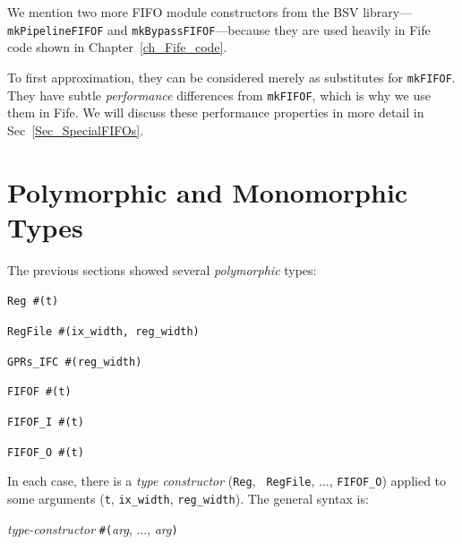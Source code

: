 
We mention two more FIFO module constructors from the BSV library---
{\tt mkPipelineFIFOF} and {\tt mkBypassFIFOF}---because they are used
heavily in Fife code shown in Chapter~\ref{ch_Fife_code}.

To first approximation, they can be considered merely as substitutes
for {\tt mkFIFOF}.  They have subtle \emph{performance} differences
from {\tt mkFIFOF}, which is why we use them in Fife.  We will discuss
these performance properties in more detail in
Sec~\ref{Sec_SpecialFIFOs}.


\section{Polymorphic and Monomorphic Types}

\label{Sec_Polymorphic_Types}



The previous sections showed several \emph{polymorphic} types:

{\small
\begin{tightlist}
 \item \verb|Reg #(t)|
 \item \verb|RegFile #(ix_width, reg_width)|
 \item \verb|GPRs_IFC #(reg_width)|
 \item \verb|FIFOF #(t)|
 \item \verb|FIFOF_I #(t)|
 \item \verb|FIFOF_O #(t)|
\end{tightlist}
}

In each case, there is a \emph{type constructor} ({\tt Reg}, {\tt
RegFile}, ..., {\tt FIFOF\_O}) applied to some arguments ({\tt t},
{\tt ix\_width}, {\tt reg\_width}).  The general syntax is:

\begin{tabbing}
\hmm \emph{type-constructor} {\tt \#(}\emph{arg}, ..., \emph{arg}{\tt )}
\end{tabbing}

